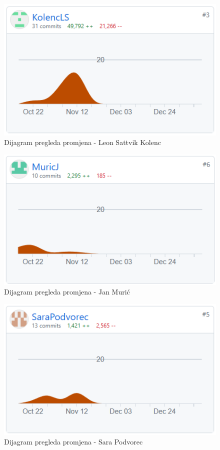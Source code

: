		\begin{figure}[H]
			\includegraphics[scale=0.80]{slike/leon.png} %
			\centering
			\caption{Dijagram pregleda promjena - Leon Sattvik Kolenc}
			\label{fig:DijagramPregledaPromjena}
		\end{figure}

		\begin{figure}[H]
			\includegraphics[scale=0.80]{slike/jan.png} %
			\centering
			\caption{Dijagram pregleda promjena - Jan Murić}
			\label{fig:DijagramPregledaPromjena}
		\end{figure}

		\begin{figure}[H]
			\includegraphics[scale=0.80]{slike/sara.png} %
			\centering
			\caption{Dijagram pregleda promjena - Sara Podvorec}
			\label{fig:DijagramPregledaPromjena}
		\end{figure}

